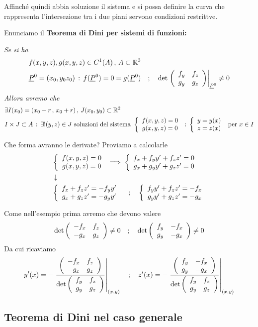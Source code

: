 Affinché quindi abbia soluzione il sistema e si possa definire la curva che rappresenta l'intersezione tra i due piani servono condizioni restrittve. 

Enunciamo il \textbf{Teorema di Dini per sistemi di funzioni:}

\bigskip

\textit{Se si ha}
\begin{align}
	{}&f(x,y,z),g(x,y,z) \in C^1(A) \, , \, A\subset \mathbb{R}^3\\
	&\underline{P}^0=(x_0,y_0z_0) \, : \, f(\underline{P}^0)=0=g(\underline{P}^0) \quad ; \quad \det \left. \left( \begin{array}{ccc} f_y & f_z \\ g_y & g_z \end{array} \right)\right|_{\underline{P}^0}\neq 0
\end{align}
\textit{Allora avremo che}
\begin{align}
	{}&\exists I(x_0) = (x_0 - r \, , \, x_0 +r) \, , \, J(x_0,y_0)\subset \mathbb{R}^2\\
	&I \times J \subset A \, : \, \exists ! (y,z)\in J \text{ soluzioni del sistema } \left\{\begin{array}{cc} f(x,y,z)=0 \\ g(x,y,z)=0 \end{array}\right. \, : \, \left\{\begin{array}{cc} y=y(x) \\ z=z(x) \end{array}\right. \text{ per } x\in I
\end{align}

Che forma avranno le derivate? Proviamo a calcolarle
\begin{align}
	{}&\left\{\begin{array}{cc} f(x,y,z)=0 \\ g(x,y,z)=0 \end{array}\right. \implies \left\{\begin{array}{cc} f_x + f_y y' + f_z z'=0 \\ g_x + g_y y' + g_z z'=0 \end{array}\right. \nonumber \\ &\downarrow \nonumber \\ 
	&\left\{\begin{array}{cc} f_x +  f_z z' = -f_y y'  \\ g_x + g_z z'=-g_y y' \end{array}\right. \quad ; \quad \left\{\begin{array}{cc} f_y y' +  f_z z'= -f_x  \\ g_y y'+ g_z z'=-g_x \end{array}\right.
\end{align}

Come nell'esempio prima avremo che devono valere
\begin{align}
	\det \left( \begin{array}{ccc} -f_x & f_z \\ -g_x & g_z \end{array} \right) \neq 0 \quad ; \quad \det \left( \begin{array}{ccc} f_y & -f_x \\ g_y & -g_x \end{array} \right) \neq 0
\end{align}
Da cui ricaviamo
\begin{align}
	y'(x)= - \left. \frac{\left( \begin{array}{ccc} -f_x & f_z \\ -g_x & g_z \end{array} \right)}{\det  \left( \begin{array}{ccc} f_y & f_z \\ g_y & g_z \end{array} \right)} \right|_{(x,y)}
	\quad ; \quad
	z'(x)= - \left. \frac{\left( \begin{array}{ccc} f_y & -f_x \\ g_y & -g_x \end{array} \right)}{\det  \left( \begin{array}{ccc} f_y & f_z \\ g_y & g_z \end{array} \right)} \right|_{(x,y)}
\end{align}

\newpage 

\subsection{Teorema di Dini nel caso generale}

